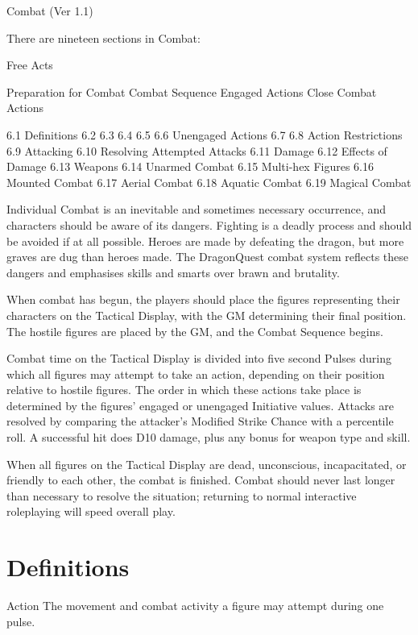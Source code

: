 \begin{Chapter}{Combat (Ver 1.1)}

There are nineteen sections in Combat: 

Free Acts 

Preparation for Combat 
Combat Sequence 
Engaged Actions 
Close Combat Actions 

6.1   Definitions 
6.2  
6.3  
6.4  
6.5  
6.6   Unengaged Actions 
6.7  
6.8   Action Restrictions 
6.9   Attacking 
6.10   Resolving Attempted Attacks 
6.11   Damage 
6.12   Effects of Damage 
6.13   Weapons 
6.14   Unarmed Combat 
6.15   Multi-hex Figures 
6.16   Mounted Combat 
6.17   Aerial Combat 
6.18   Aquatic Combat 
6.19   Magical Combat 

Individual Combat is an inevitable and sometimes necessary occurrence,
and characters should be aware of its dangers.  Fighting is a deadly
process and should be avoided if at all possible. Heroes are made by
defeating the dragon, but more graves are dug than heroes made.  The
DragonQuest combat system reflects these dangers and emphasises skills
and smarts over brawn and brutality.

When combat has begun, the players should place the figures
representing their characters on the Tactical Display, with the GM
determining their final position. The hostile figures are placed by
the GM, and the Combat Sequence begins.

Combat time on the Tactical Display is divided into five second Pulses
during which all figures may attempt to take an action, depending on
their position relative to hostile figures.  The order in which these
actions take place is determined by the figures’ engaged or unengaged
Initiative values.  Attacks are resolved by comparing the attacker’s
Modified Strike Chance with a percentile roll.  A successful hit does
D10 damage, plus any bonus for weapon type and skill.

When all figures on the Tactical Display are dead, unconscious,
incapacitated, or friendly to each other, the combat is
finished. Combat should never last longer than necessary to resolve
the situation; returning to normal interactive roleplaying will speed
overall play.

\section{Definitions}

Action The movement and combat activity a figure 
may attempt during one pulse. 


\end{Chapter}

